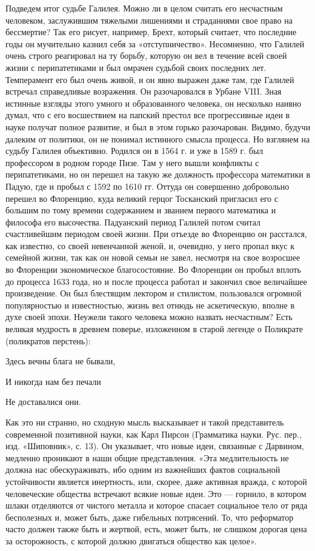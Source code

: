 Подведем итог судьбе Галилея. Можно  ли в целом считать его несчастным
человеком,  заслужившим тяжелыми  лишениями и  страданиями свое  право
на  бессмертие?  Так его  рисует,  например,  Брехт, который  считает,
что  последние годы  он  мучительно казнил  себя за  «отступничество».
Несомненно, что Галилей очень строго  реагировал на ту борьбу, которую
он  вел в  течение всей  своей жизни  с перипатетиками  и был  омрачен
судьбой своих  последних лет.  Темперамент его был  очень живой,  и он
явно выражен  даже там, где Галилей  встречал справедливые возражения.
Он разочаровался  в Урбане  VIII. Зная  истинные взгляды  этого умного
и  образованного  человека,  он  несколько наивно  думал,  что  с  его
восшествием на папский престол все  прогрессивные идеи в науке получат
полное  развитие, и  был  в этом  горько  разочарован. Видимо,  будучи
далеким  от политики,  он  не понимал  истинного  смысла процесса.  Но
взглянем на  судьбу Галилея объективно. Родился  он в 1564 г.  и уже в
1589  г. был  профессором  в  родном городе  Пизе.  Там  у него  вышли
конфликты  с  перипатетиками, но  он  перешел  на такую  же  должность
профессора математики в Падую, где и  пробыл с 1592 по 1610 гг. Оттуда
он совершенно  добровольно перешел  во Флоренцию, куда  великий герцог
Тосканский  пригласил его  с  большим по  тому  времени содержанием  и
званием  первого  математика  и философа  его  высочества.  Падуанский
период  Галилей  потом  считал  счастливейшим  периодом  своей  жизни.
При  отъезде  во  Флоренцию  он  расстался,  как  известно,  со  своей
невенчанной женой, и,  очевидно, у него пропал вкус  к семейной жизни,
так  как он  новой  семьи  не завел,  несмотря  на  свое возросшее  во
Флоренции экономическое благосостояние. Во  Флоренции он пробыл вплоть
до процесса  1633 года, но  и после  процесса работал и  закончил свое
величайшее  произведение.  Он  был  блестящим  лектором  и  стилистом,
пользовался огромной популярностью и известностью, жизнь вел отнюдь не
аскетическую,  вполне  в духе  своей  эпохи.  Неужели такого  человека
можно  назвать несчастным?  Есть великая  мудрость в  древнем поверье,
изложенном в старой легенде о Поликрате (поликратов перстень):

Здесь вечны блага не бывали,

И никогда нам без печали

Не доставалися они.

Как это ни странно, но сходную мысль высказывает и такой представитель
современной позитивной науки, как  Карл Пирсон (Грамматика науки. Рус.
пер., изд. «Шиповник», с. 13). Он указывает, что новые идеи, связанные
с  Дарвином,  медленно  проникают  в наши  общие  представления.  «Эта
медлительность не  должна нас  обескураживать, ибо одним  из важнейших
фактов социальной устойчивости является  инертность, или, скорее, даже
активная  вражда, с  которой  человеческие  общества встречают  всякие
новые идеи.  Это ---  горнило, в котором  шлаки отделяются  от чистого
металла и которое спасает социальное тело от ряда бесполезных и, может
быть, даже гибельных потрясений. То, что реформатор часто должен также
быть  и  жертвой,  есть,  может  быть,  не  слишком  дорогая  цена  за
осторожность, с которой должно двигаться общество как целое».

